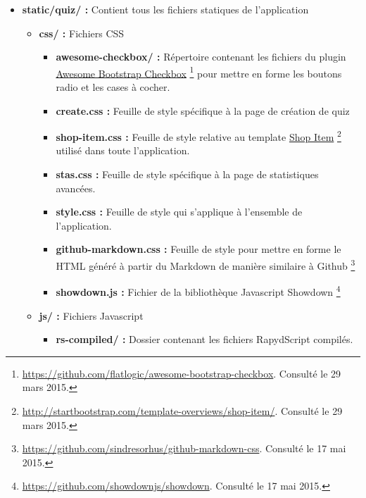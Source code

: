 \documentclass[a4,10pt,french]{sphinxmanual}
\begin{document}
\begin{itemize}
\begin{itemize}
\end{itemize}

\item {} 
\textbf{static/quiz/ :} Contient tous les fichiers statiques de l'application
\begin{itemize}
\item {} 
\textbf{css/ :} Fichiers CSS
\begin{itemize}
\item {} 
\textbf{awesome-checkbox/ :} Répertoire contenant les fichiers du plugin \href{https://github.com/flatlogic/awesome-bootstrap-checkbox}{Awesome Bootstrap Checkbox} \footnote{
\href{https://github.com/flatlogic/awesome-bootstrap-checkbox}{https://github.com/flatlogic/awesome-bootstrap-checkbox}. Consulté le 29 mars 2015.
} pour mettre en forme les boutons radio et les cases à cocher.

\item {} 
\textbf{create.css :} Feuille de style spécifique à la page de création de quiz

\item {} 
\textbf{shop-item.css :} Feuille de style relative au template \href{http://startbootstrap.com/template-overviews/shop-item/}{Shop Item} \footnote{
\href{http://startbootstrap.com/template-overviews/shop-item/}{http://startbootstrap.com/template-overviews/shop-item/}. Consulté le 29 mars 2015.
} utilisé dans toute l'application.

\item {} 
\textbf{stas.css :} Feuille de style spécifique à la page de statistiques avancées.

\item {} 
\textbf{style.css :} Feuille de style qui s'applique à l'ensemble de l'application.

\item {} 
\textbf{github-markdown.css :} Feuille de style pour mettre en forme le HTML généré à partir du Markdown de manière similaire à Github \footnote{
\href{https://github.com/sindresorhus/github-markdown-css}{https://github.com/sindresorhus/github-markdown-css}. Consulté le 17 mai 2015.
}

\item {} 
\textbf{showdown.js :} Fichier de la bibliothèque Javascript Showdown \footnote{
\href{https://github.com/showdownjs/showdown}{https://github.com/showdownjs/showdown}. Consulté le 17 mai 2015.
}

\end{itemize}

\item {} 
\textbf{js/ :} Fichiers Javascript
\begin{itemize}
\item {} 
\textbf{rs-compiled/ :} Dossier contenant les fichiers RapydScript compilés.


\end{itemize}
\end{itemize}
\end{itemize}
\end{document}
